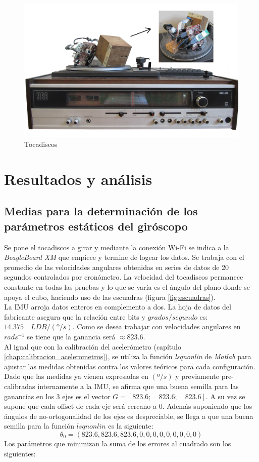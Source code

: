 \documentclass[main]{subfiles}
\begin{document}
\begin{figure}[h!]
	\centering
	\includegraphics[width=.9\textwidth]{./pics_gyro/tocadiscos.jpg}
	\caption{Tocadiscos}
	\label{fig:tocadiscos}
\end{figure}


\section{Resultados y análisis}
\subsection{Medias para la determinaci\'on de los par\'ametros est\'aticos del giróscopo}
Se pone el tocadiscos a girar y mediante la conexión Wi-Fi se indica a la \emph{BeagleBoard XM} que empiece y termine de logear los datos. Se trabaja con el promedio de las velocidades angulares obtenidas en series de datos de 20 segundos controlados por cronómetro. La velocidad del tocadiscos permanece constante en todas las pruebas y lo que se varía es el ángulo del plano donde se apoya el cubo, haciendo uso de las escuadras (figura \ref{fig:escuadras}).\\

La IMU arroja datos enteros en complemento a dos. La hoja de datos del fabricante asegura que la relaci\'on entre bits y $grados/segundo$ es: $14.375\quad LDB/(º/s)$. Como se desea trabajar con velocidades angulares en $rad s^{-1}$ se tiene que la ganancia ser\'a $\approx 823.6$.\\

Al igual que con la calibración del acelerómetro (capítulo \ref{chap:calibracion_acelerometros}), se utiliza la función \emph{lsqnonlin} de \emph{Matlab} para ajustar las medidas obtenidas contra los valores teóricos para cada configuración. Dado que las medidas ya vienen expresadas en $(º/s)$ y previamente pre-calibradas internamente a la IMU, se afirma que una buena semilla para las ganancias en los 3 ejes es el vector $G=[823.6;\quad 823.6;\quad 823.6]$. A su vez se supone que cada offset de cada eje será cercano a 0. Además suponiendo que los ángulos de no-ortogonalidad de los ejes es despreciable, se llega a que una buena semilla para la función $lsqnonlin$ es la siguiente:
$$\theta _0=\left(823.6,823.6,823.6,0,0,0,0,0,0,0,0,0\right)$$
Los parámetros que minimizan la suma de los errores al cuadrado son los siguientes:
\end{document}
